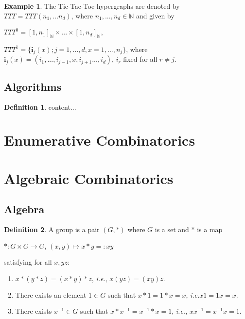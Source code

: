 \documentclass[]{article}
\theoremstyle{definition}
\newtheorem{definition}{Definition}[section]
\theoremstyle{definition}
\newtheorem{exmp}{Example}[section]
\newcommand{\raw}{\rightarrow}
\newcommand{\ie}{\textit{i.e.}}
\newcommand{\bb}{\mathbb}
\newcommand{\mum}{^{-1}}
\begin{document}
	\begin{exmp}
		The Tic-Tac-Toe hypergraphs are denoted by $TTT = TTT(n_1, ... n_d)$, where $n_1, ..., n_d \in \bb{N}$ and given by 
		
		\begin{center}
			$TTT^0 = [1, n_1]_{\bb{N}}\times...\times[1, n_d]_{\bb{N}}$,
			
			$TTT^1 = \{ \boldsymbol{i}_j(x); j=1, ..., d, x=1, ..., n_j \}$, where $\boldsymbol{i}_j(x)=(i_1, ..., i_{j-1}, x, i_{j+1} ..., i_d )$, $i_r$ fixed for all $r\neq j$.
		\end{center}
		
		\subsection{Algorithms}
		
		\begin{definition}
			content...
		\end{definition}
		
	\end{exmp}
	
	\section{Enumerative Combinatorics}
	\section{Algebraic Combinatorics}
	\subsection{Algebra}
	
	\begin{definition}
		A group is a pair $(G, *)$ where $G$ is a set and $*$ is a map 
		
		\begin{center}
			$*: G\times G \raw G$, $(x, y) \mapsto x* y =: xy$
		\end{center}
		
		\noindent satisfying for all $x, y z$:
		
		\begin{enumerate}
			\item $x * (y * z) = (x * y) * z$, \ie, $x(yz)=(xy)z$.
			
			\item There exists an element $1 \in G$ such that $x* 1 = 1 * x = x$, \ie $x1 = 1x = x$.
			
			\item There exists $x\mum \in G$ such that $x* x\mum = x\mum * x = 1$, \ie, $xx\mum = x\mum x = 1$.
			
		\end{enumerate}
	\end{definition}
	
\end{document}
